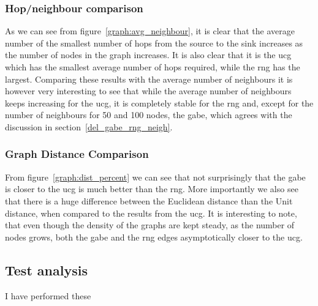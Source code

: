 \subsubsection{Hop/neighbour comparison}
\label{section:hop_neighbour_comparison}

As we can see from figure~\ref{graph:avg_neighbour}, it is clear that the average number of the smallest number of hops from the source to the sink increases as the number of nodes in the graph increases. It is also clear that it is the \ac{ucg} which has the smallest average number of hops required, while the \ac{rng} has the largest. Comparing these results with the average number of neighbours it is however very interesting to see that while the average number of neighbours keeps increasing for the \ac{ucg}, it is completely stable for the \ac{rng} and, except for the number of neighbours for 50 and 100 nodes, the \ac{gabe}, which agrees with the discussion in section~\ref{del_gabe_rng_neigh}. 

\subsubsection{Graph Distance Comparison}
\label{section:graph_distance_comparison}


From figure~\ref{graph:dist_percent} we can see that not surprisingly that the \ac{gabe} is closer to the \ac{ucg} is much better than the \ac{rng}. More importantly we also see that there is a huge difference between the Euclidean distance than the Unit distance, when compared to the results from the \ac{ucg}. It is interesting to note, that even though the density of the graphs are kept steady, as the number of nodes grows, both the \ac{gabe} and the \ac{rng} edges asymptotically closer to the \ac{ucg}. 

\subsection{}







\subsection{Test analysis}


I have performed these


\subsection{}
\label{section:test_results_spanners}
